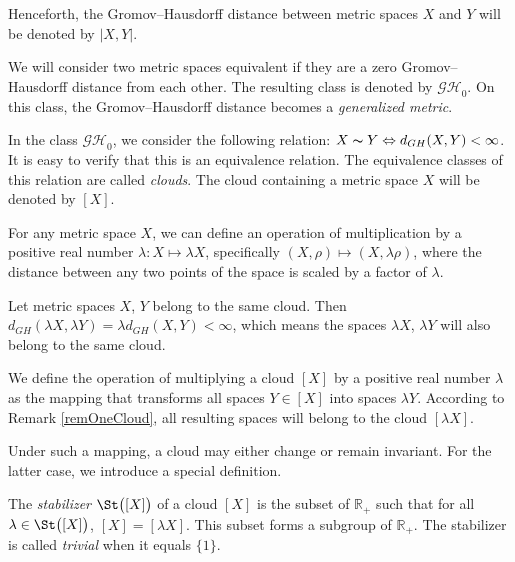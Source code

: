 \documentclass[leqno]{article}
\begin{document}
Henceforth, the Gromov--Hausdorff distance between metric spaces $ X $ and $ Y $ will be denoted by $ |X,Y| $.  

 We will consider two metric spaces equivalent if they are a zero Gromov--Hausdorff distance from each other. The resulting class is denoted by $ \mathcal{GH}_0 $. On this class, the Gromov--Hausdorff distance becomes a \emph{generalized metric}.  

\begin{defin}
In the class $\mathcal{GH}_{0}$, we consider the following relation: $X \thicksim Y \Leftrightarrow d_{GH}(X, Y) < \infty$. It is easy to verify that this is an equivalence relation. The equivalence classes of this relation are called \emph{clouds}. The cloud containing a metric space $X$ will be denoted by $[X]$.
\end{defin}

For any metric space $X$, we can define an operation of multiplication by a positive real number $\lambda\colon X\mapsto \lambda X$, specifically $(X, \rho) \mapsto (X, \lambda \rho)$, where the distance between any two points of the space is scaled by a factor of $\lambda$.

\begin{remark}
Let metric spaces $X$, $Y$ belong to the same cloud. Then $d_{GH}(\lambda X, \lambda Y) = \lambda d_{GH}(X,Y)\allowbreak < \infty$, which means the spaces $\lambda X$, $\lambda Y$ will also belong to the same cloud.
\label{remOneCloud}
\end{remark}

\begin{defin}
We define the operation of multiplying a cloud $[X]$ by a positive real number $\lambda$ as the mapping that transforms all spaces $Y \in [X]$ into spaces $\lambda Y$. According to Remark \ref{remOneCloud}, all resulting spaces will belong to the cloud $[\lambda X]$.
\end{defin}

Under such a mapping, a cloud may either change or remain invariant. For the latter case, we introduce a special definition.

\begin{defin}
The \emph{stabilizer} $\St\bigl([X]\bigr)$ of a cloud $[X]$ is the subset of $\mathbb{R}_+$ such that for all $\lambda \in \St\bigl([X]\bigr)$, $[X] = [\lambda X]$. This subset forms a subgroup of $\mathbb{R}_+$. The stabilizer is called \emph{trivial} when it equals $\{1\}$.
\end{defin}
\end{document}
